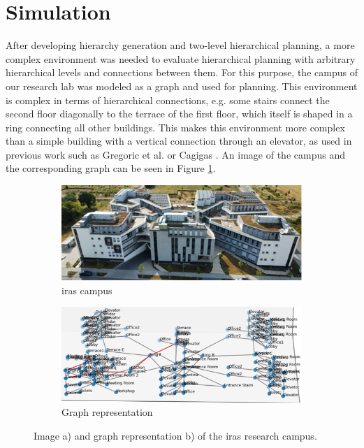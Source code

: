\section{Simulation}
\label{sec:simulation}
After developing hierarchy generation and two-level hierarchical planning, a more complex environment was needed to evaluate hierarchical planning with arbitrary hierarchical levels and connections between them. For this purpose, the campus of our research lab was modeled as a graph and used for planning. This environment is complex in terms of hierarchical connections, e.g. some stairs connect the second floor diagonally to the terrace of the first floor, which itself is shaped in a ring connecting all other buildings. This makes this environment more complex than a simple building with a vertical connection through an elevator, as used in previous work such as Gregoric et al. \cite{gregoric_autonomous_2022} or Cagigas \cite{cagigas_hierarchical_2005}. An image of the campus and the corresponding graph can be seen in Figure \ref{fig:ltc_rendering}.

\begin{figure}[h]
    \captionsetup[subfigure]{justification=centering}
    \centering
    \begin{subfigure}{.5\textwidth}
      \centering
      \includegraphics[width=\textwidth]{figures/30_methods/ltc_real.jpg}
      \caption{\gls{iras} campus}
    \end{subfigure}%
    \begin{subfigure}{.5\textwidth}
      \centering
      \includegraphics[width=\textwidth]{figures/30_methods/ltc_graph.png}
      \caption{Graph representation}
    \end{subfigure}
    \captionsetup{justification=centering}
    \caption[Image and graph representation of the \gls{iras} research campus]{Image a) and graph representation b) of the \gls{iras} research campus.}
    \label{fig:ltc_rendering}
\end{figure}

